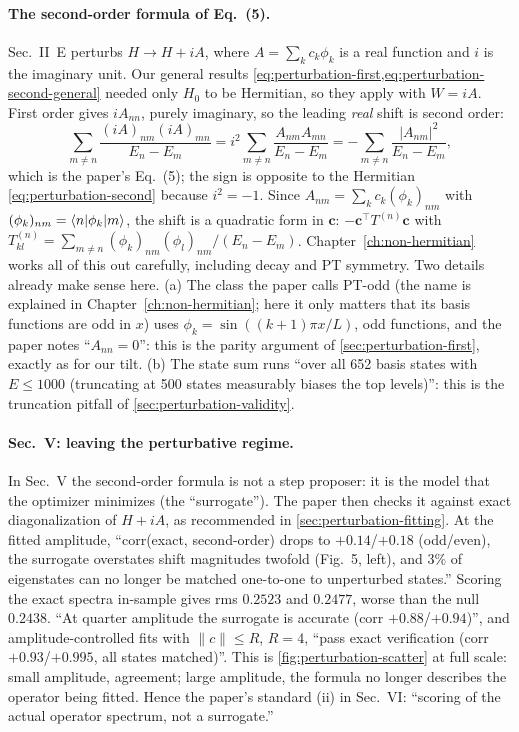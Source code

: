 \paragraph{The second-order formula of Eq.~(5).}
Sec.~II~E perturbs $H\to H+iA$, where $A=\sum_kc_k\phi_k$ is a real function and $i$ is the imaginary unit. Our general results \cref{eq:perturbation-first,eq:perturbation-second-general} needed only $H_0$ to be Hermitian, so they apply with $W=iA$. First order gives $iA_{nn}$, purely imaginary, so the leading \emph{real} shift is second order:
\[
\sum_{m\ne n}\frac{(iA)_{nm}(iA)_{mn}}{E_n-E_m}=i^2\sum_{m\ne n}\frac{A_{nm}A_{mn}}{E_n-E_m}=-\sum_{m\ne n}\frac{|A_{nm}|^2}{E_n-E_m},
\]
which is the paper's Eq.~(5); the sign is opposite to the Hermitian \cref{eq:perturbation-second} because $i^2=-1$. Since $A_{nm}=\sum_kc_k(\phi_k)_{nm}$ with $(\phi_k)_{nm}=\langle n|\phi_k|m\rangle$, the shift is a quadratic form in $\bm c$: $-\bm c^{\top}T^{(n)}\bm c$ with $T^{(n)}_{kl}=\sum_{m\ne n}(\phi_k)_{nm}(\phi_l)_{nm}/(E_n-E_m)$. Chapter~\ref{ch:non-hermitian} works all of this out carefully, including decay and PT symmetry. Two details already make sense here. (a) The class the paper calls PT-odd (the name is explained in Chapter~\ref{ch:non-hermitian}; here it only matters that its basis functions are odd in $x$) uses $\phi_k=\sin((k+1)\pi x/L)$, odd functions, and the paper notes ``$A_{nn}=0$'': this is the parity argument of \cref{sec:perturbation-first}, exactly as for our tilt. (b) The state sum runs ``over all 652 basis states with $E\le1000$ (truncating at 500 states measurably biases the top levels)'': this is the truncation pitfall of \cref{sec:perturbation-validity}.

\paragraph{Sec.~V: leaving the perturbative regime.}
In Sec.~V the second-order formula is not a step proposer: it is the model that the optimizer minimizes (the ``surrogate''). The paper then checks it against exact diagonalization of $H+iA$, as recommended in \cref{sec:perturbation-fitting}. At the fitted amplitude, ``corr(exact, second-order) drops to $+0.14$/$+0.18$ (odd/even), the surrogate overstates shift magnitudes twofold (Fig.~5, left), and 3\% of eigenstates can no longer be matched one-to-one to unperturbed states.'' Scoring the exact spectra in-sample gives rms $0.2523$ and $0.2477$, worse than the null $0.2438$. ``At quarter amplitude the surrogate is accurate (corr $+0.88$/$+0.94$)'', and amplitude-controlled fits with $\lVert c\rVert\le R$, $R=4$, ``pass exact verification (corr $+0.93$/$+0.995$, all states matched)''. This is \cref{fig:perturbation-scatter} at full scale: small amplitude, agreement; large amplitude, the formula no longer describes the operator being fitted. Hence the paper's standard (ii) in Sec.~VI: ``scoring of the actual operator spectrum, not a surrogate.''

